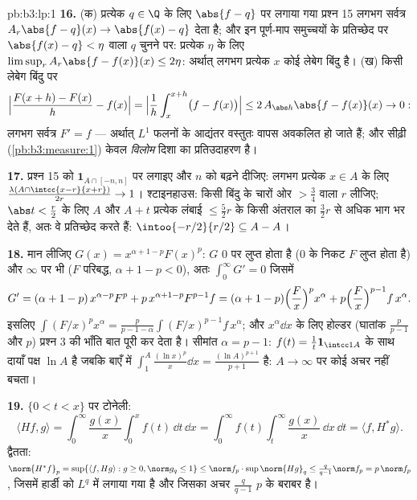 \begin{solution}{pb:b3:lp:1}
\textbf{16.} (क) प्रत्येक $q \in \Q$ के लिए $\abs{f - q}$ पर लगाया गया प्रश्न
15 लगभग सर्वत्र $A_r\abs{f - q}(x) \to \abs{f(x) - q}$ देता है; और इन पूर्ण-माप समुच्चयों के प्रतिच्छेद
पर $\abs{f(x) - q} < \eta$ वाला $q$ चुनने पर: प्रत्येक $\eta$ के लिए $\limsup_rA_r\abs{f - f(x)}(x) \leq 2\eta$: अर्थात्
लगभग प्रत्येक $x$ कोई लेबेग बिंदु है। (ख) किसी लेबेग बिंदु पर
\[
\Bigl|\frac{F(x + h) - F(x)}h - f(x)\Bigr|
= \Bigl|\frac1h\int_x^{x+h}\bigl(f - f(x)\bigr)\Bigr|
\leq 2\,A_{\abs h}\abs{f - f(x)}(x) \to 0 :
\]
लगभग सर्वत्र $F' = f$ --- अर्थात् $L^1$ फलनों के आद्यंतर वस्तुतः वापस
अवकलित हो जाते हैं; और सीढ़ी (\cref{pb:b3:measure:1}) केवल \emph{विलोम} दिशा का
प्रतिउदाहरण है।

\textbf{17.} प्रश्न 15 को $\mathbf 1_{A\cap[-n,n]}$ पर लगाइए और $n$ को बढ़ने दीजिए:
लगभग प्रत्येक $x \in A$ के लिए  $\frac{\lambda(A\cap\intcc{x-r}{x+r})}{2r} \to 1$। श्टाइनहाउस: किसी  बिंदु
के चारों ओर  $> \frac34$ वाला $r$ लीजिए; $\abs t < \frac r2$ के लिए $A$ और
$A + t$ प्रत्येक लंबाई $\leq \frac52r$ के किसी अंतराल का $\frac32r$ से अधिक भाग भर
देते हैं, अतः वे प्रतिच्छेद करते हैं: $\intoo{-r/2}{r/2} \subseteq A - A$।

\textbf{18.} मान लीजिए $G(x) = x^{\alpha+1-p}F(x)^p$: $G$ $0$ पर लुप्त होता है ($0$
के निकट $F$ लुप्त होता है) और $\infty$ पर भी ($F$ परिबद्ध, $\alpha + 1 - p < 0$),
अतः $\int_0^\infty G' = 0$ जिसमें
\[
G' = (\alpha + 1 - p)\,x^{\alpha-p}F^p +
p\,x^{\alpha+1-p}F^{p-1}f
= (\alpha + 1 - p)\Bigl(\frac Fx\Bigr)^px^\alpha +
p\Bigl(\frac Fx\Bigr)^{p-1}f\,x^\alpha .
\]
इसलिए $\int(F/x)^px^\alpha = \frac{p}{p-1-\alpha}
\int(F/x)^{p-1}f\,x^\alpha$; और  $x^\alpha\dd x$ के लिए होल्डर (घातांक $\frac p{p-1}$ और $p$)
प्रश्न 3 की भाँति बात पूरी कर देता है। सीमांत $\alpha = p - 1$: $f(t) =
\frac1t\mathbf 1_{\intcc1A}$ के साथ
दायाँ पक्ष $\ln A$ है जबकि बाएँ में $\int_1^A\frac{(\ln x)^p}x\dd x =
\frac{(\ln A)^{p+1}}{p+1}$ है: $A \to
\infty$ पर कोई अचर नहीं
बचता।

\textbf{19.} $\{0 < t < x\}$ पर टोनेली:
\[
\langle Hf, g\rangle =
\int_0^\infty\frac{g(x)}x\int_0^xf(t)\,\dd t\,\dd x
= \int_0^\infty f(t)\int_t^\infty\frac{g(x)}x\,\dd x\,\dd t
= \langle f, H^*g\rangle .
\]
द्वैतता: $\norm{H^*f}_p = \sup\{\langle f, Hg\rangle : g
\geq 0, \norm g_q \leq 1\} \leq \norm f_p\cdot
\sup\norm{Hg}_q \leq \frac q{q-1}\norm f_p = p\,\norm f_p$, जिसमें हार्डी को $L^q$ में लगाया गया है और जिसका
अचर $\frac q{q-1}$ $p$ के बराबर है।


\end{solution}
